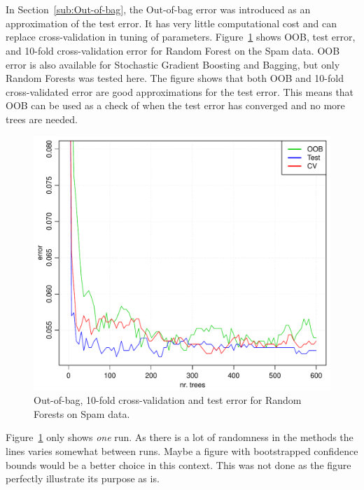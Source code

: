 \\
\\
In Section~\ref{sub:Out-of-bag}, the Out-of-bag error was introduced as an approximation of the test error. It has very little computational cost and can replace cross-validation in tuning of parameters. Figure~\ref{fig:OOBvsTestvsCV} shows OOB, test error, and 10-fold cross-validation error for Random Forest on the Spam data. 
OOB error is also available for Stochastic Gradient Boosting and Bagging, but only Random Forests was tested here.
The figure shows that both OOB and 10-fold cross-validated error are good approximations for the test error. This means that OOB can be used as a check of when the test error has converged and no more trees are needed. 

\begin{figure}[htbp]
\begin{center}
    \includegraphics[scale=0.5]{./figures/OOBvsTestvsCV.pdf}
\end{center}
\caption{Out-of-bag, 10-fold cross-validation and test error for Random Forests on Spam data.}
\label{fig:OOBvsTestvsCV}
\end{figure}

Figure~\ref{fig:OOBvsTestvsCV} only shows \textit{one} run. As there is a lot of randomness in the methods the lines varies somewhat between runs. Maybe a figure with bootstrapped confidence bounds would be a better choice in this context. This was not done as the figure perfectly illustrate its purpose as is. 

